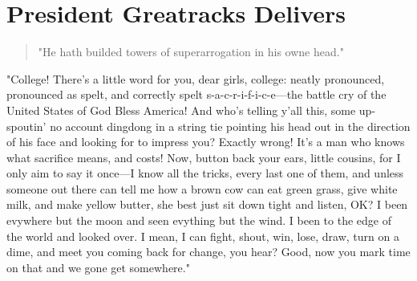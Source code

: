 \chapter{President Greatracks Delivers}


\begin{quotation}
"He hath builded towers of superarrogation 
in his owne head."  \\
\end{quotation}
\vspace{0.2cm}

  "College! There's a little word for you, dear girls, college: neatly
pronounced, pronounced as spelt, and correctly spelt s-a-c-r-i-f-i-c-e---the
battle cry of the United States of God Bless America! And who's telling y'all
this, some up-spoutin' 
no account dingdong 
in a string tie pointing his head out
in the direction of his face and looking for to impress you? Exactly wrong! It's
a man who knows what sacrifice means, and costs! Now, button back your ears,
little cousins, for I only aim to say it once---I know all the tricks, every last
one of them, and unless someone out there can tell me how a brown cow can eat
green grass, give white milk, and make yellow butter, she best just sit down
tight and listen, OK? I been evywhere but the moon and seen evything but the
wind. I been to the edge of the world and looked over. I mean, I can fight,
shout, win, lose, draw, turn on a dime, and meet you coming back for change, you
hear? Good, now you mark time on that and we gone get somewhere."
 
